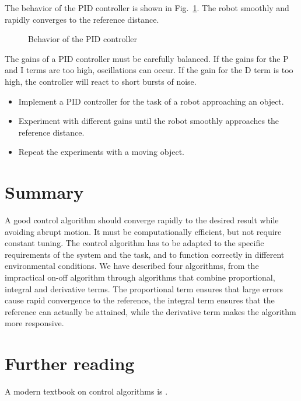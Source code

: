 The behavior of the PID controller is shown in Fig.~\ref{fig.pid-control}. The robot smoothly and rapidly converges to the reference distance. 

\begin{figure}
\begin{center}
\caption{Behavior of the PID controller}\label{fig.pid-control}
\end{center}
\end{figure}

The gains of a PID controller must be carefully balanced. If the gains for the P and I terms are too high, oscillations can occur. If the gain for the D term is too high, the controller will react to short bursts of noise.


\begin{framed}
\begin{itemize}
\item Implement a PID controller for the task of a robot approaching an object.
\item Experiment with different gains until the robot smoothly approaches the reference distance.
\item Repeat the experiments with a moving object.
\end{itemize}
\end{framed}

\section{Summary}

A good control algorithm should converge rapidly to the desired result while
avoiding abrupt motion. It must be computationally efficient, but not require constant tuning. The control algorithm has to be adapted to the specific requirements of the system and the task, and to function correctly in different environmental conditions. We have described four algorithms, from the impractical on-off algorithm through algorithms that combine proportional, integral and derivative terms. The proportional term ensures that large errors cause rapid convergence to the reference, the integral term ensures that the reference can actually be attained, while the derivative term makes the algorithm more responsive. 

\section{Further reading}

A modern textbook on control algorithms is \cite{astrom-murray}.



